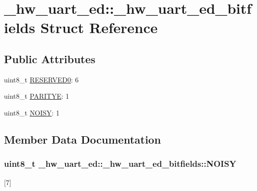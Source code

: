 \hypertarget{struct__hw__uart__ed_1_1__hw__uart__ed__bitfields}{}\section{\+\_\+hw\+\_\+uart\+\_\+ed\+:\+:\+\_\+hw\+\_\+uart\+\_\+ed\+\_\+bitfields Struct Reference}
\label{struct__hw__uart__ed_1_1__hw__uart__ed__bitfields}
\subsection*{Public Attributes}
\begin{DoxyCompactItemize}
\item 
uint8\+\_\+t \hyperlink{struct__hw__uart__ed_1_1__hw__uart__ed__bitfields_a9595b740a35e232f1edd76f1bce8e490}{R\+E\+S\+E\+R\+V\+E\+D0}\+: 6
\item 
uint8\+\_\+t \hyperlink{struct__hw__uart__ed_1_1__hw__uart__ed__bitfields_a30b765beeb05182e99ae6754bf10c88d}{P\+A\+R\+I\+T\+YE}\+: 1
\item 
uint8\+\_\+t \hyperlink{struct__hw__uart__ed_1_1__hw__uart__ed__bitfields_a24900c08a544bbcd1b610e326c7f7634}{N\+O\+I\+SY}\+: 1
\end{DoxyCompactItemize}


\subsection{Member Data Documentation}
\subsubsection[{\texorpdfstring{N\+O\+I\+SY}{NOISY}}]{\setlength{\rightskip}{0pt plus 5cm}uint8\+\_\+t \+\_\+hw\+\_\+uart\+\_\+ed\+::\+\_\+hw\+\_\+uart\+\_\+ed\+\_\+bitfields\+::\+N\+O\+I\+SY}\hypertarget{struct__hw__uart__ed_1_1__hw__uart__ed__bitfields_a24900c08a544bbcd1b610e326c7f7634}{}\label{struct__hw__uart__ed_1_1__hw__uart__ed__bitfields_a24900c08a544bbcd1b610e326c7f7634}
\mbox{[}7\mbox{]} 
